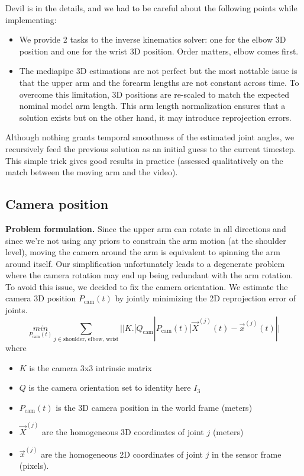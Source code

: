 Devil is in the details, and we had to be careful about the following points while implementing:
\begin{itemize}
    \item We provide 2 tasks to the inverse kinematics solver: one for the elbow 3D position and one for the wrist 3D position. 
    Order matters, elbow comes first.
    \item The mediapipe 3D estimations are not perfect but the most nottable issue is that 
    the upper arm and the forearm lengths are not constant across time. To overcome this limitation,
    3D positions are re-scaled to match the expected nominal model arm length. 
    This arm length normalization ensures that a solution exists but on the other hand, it may introduce reprojection errors.
\end{itemize}
Although nothing grants temporal smoothness of the estimated joint angles, we recursively feed the previous solution as an initial guess to the current timestep.
This simple trick gives good results in practice (assessed qualitatively on the match between the moving arm and the video).


\subsection{Camera position}
\label{subsec:cam_estim}

\noindent\textbf{Problem formulation.} Since the upper arm can rotate in all directions and since we're not using any priors to constrain 
the arm motion (at the shoulder level), moving the camera around the arm is equivalent to spinning the arm around itself. 
Our simplification unfortunately leads to a degenerate problem where the camera rotation may end up being redundant with the arm rotation.
To avoid this issue, we decided to fix the camera orientation. 
We estimate the camera 3D position $P_{\text{cam}}(t)$ 
by jointly minimizing the 2D reprojection error of joints.
$$\underset{P_{\text{cam}}(t)}{min}\sum_{j\in{\text{shoulder, elbow, wrist}}} ||K.\big[Q_{\text{cam}} | P_{\text{cam}}(t)] \vec{X}^{(j)}(t) - \vec{x}^{(j)}(t) ||$$
where
\begin{itemize}
    \item $K$ is the camera 3x3 intrinsic matrix
    \item $Q$ is the camera orientation set to identity here $I_{3}$
    \item $P_{\text{cam}}(t)$ is the 3D camera position in the world frame (meters)
    \item $\vec{X}^{(j)}$ are the homogeneous 3D coordinates of joint $j$ (meters)
    \item $\vec{x}^{(j)}$ are the homogeneous 2D coordinates of joint $j$ in the sensor frame (pixels).
\end{itemize}

